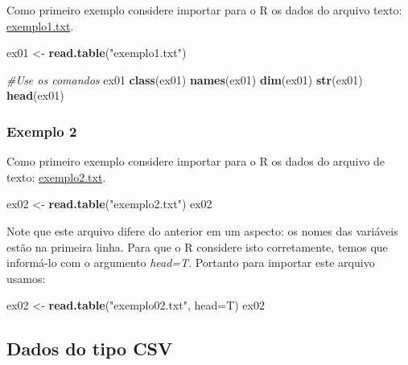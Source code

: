 \documentclass[
]{book}
\newenvironment{Shaded}{\begin{snugshade}}{\end{snugshade}}
\newcommand{\CommentTok}[1]{\textcolor[rgb]{0.56,0.35,0.01}{\textit{#1}}}
\newcommand{\DataTypeTok}[1]{\textcolor[rgb]{0.13,0.29,0.53}{#1}}
\newcommand{\KeywordTok}[1]{\textcolor[rgb]{0.13,0.29,0.53}{\textbf{#1}}}
\newcommand{\NormalTok}[1]{#1}
\newcommand{\StringTok}[1]{\textcolor[rgb]{0.31,0.60,0.02}{#1}}
\begin{document}
Como primeiro exemplo considere importar para o R os dados do arquivo texto: \href{https://www.dropbox.com/s/m7jivbbggei5y0x/exemplo1.txt?dl=1}{exemplo1.txt}.

\begin{Shaded}
\begin{Highlighting}[]
\NormalTok{ex01 <-}\StringTok{ }\KeywordTok{read.table}\NormalTok{(}\StringTok{"exemplo1.txt"}\NormalTok{) }

\CommentTok{#Use os comandos}
\NormalTok{  ex01}
  \KeywordTok{class}\NormalTok{(ex01)}
  \KeywordTok{names}\NormalTok{(ex01)}
  \KeywordTok{dim}\NormalTok{(ex01)}
  \KeywordTok{str}\NormalTok{(ex01)}
  \KeywordTok{head}\NormalTok{(ex01)}
\end{Highlighting}
\end{Shaded}

\hypertarget{exemplo-2-1}{%
\subsubsection{Exemplo 2}\label{exemplo-2-1}}

Como primeiro exemplo considere importar para o R os dados do arquivo de texto: \href{https://www.dropbox.com/s/bi4b0j2nnnetc1r/exemplo2.txt?dl=1}{exemplo2.txt}.

\begin{Shaded}
\begin{Highlighting}[]
\NormalTok{ex02 <-}\StringTok{ }\KeywordTok{read.table}\NormalTok{(}\StringTok{"exemplo2.txt"}\NormalTok{) }
\NormalTok{ex02}
\end{Highlighting}
\end{Shaded}

Note que este arquivo difere do anterior em um aspecto: os nomes das variáveis estão na primeira linha. Para que o R considere isto corretamente, temos que informá-lo com o argumento \emph{head=T}. Portanto para importar este arquivo usamos:

\begin{Shaded}
\begin{Highlighting}[]
\NormalTok{ex02 <-}\StringTok{ }\KeywordTok{read.table}\NormalTok{(}\StringTok{"exemplo02.txt"}\NormalTok{, }\DataTypeTok{head=}\NormalTok{T) }
\NormalTok{ex02}
\end{Highlighting}
\end{Shaded}

\hypertarget{dados-do-tipo-csv}{%
\subsection{Dados do tipo CSV}\label{dados-do-tipo-csv}}
\end{document}

